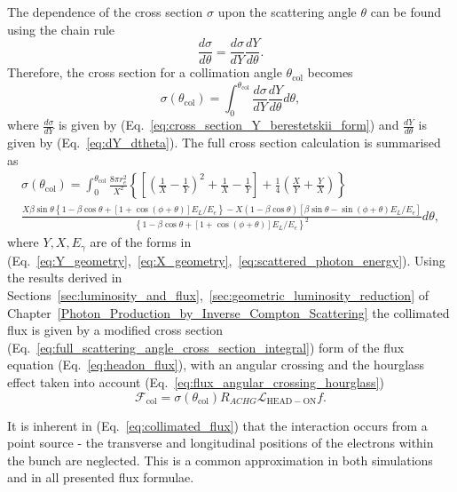 \documentclass[../main.tex]{subfiles}
\begin{document}
The dependence of the cross section $\sigma$ upon the scattering angle $\theta$ can be found using the chain rule
\begin{equation}
\frac{d\sigma}{d\theta} = \frac{d\sigma}{dY}\frac{dY}{d\theta}.
\label{eq:cross_section_chain_rule}
\end{equation}
Therefore, the cross section for a collimation angle $\theta_{\mathrm{col}}$ becomes
\begin{equation}
\sigma\left(\theta_{\mathrm{col}}\right) = \int_{0}^{\theta_{\mathrm{col}}}\frac{d\sigma}{dY}\frac{dY}{d\theta}d\theta,
\label{eq:cross_section_integral}
\end{equation} 
where $\frac{d\sigma}{dY}$ is given by (Eq.~\ref{eq:cross_section_Y_berestetskii_form}) and $\frac{dY}{d\theta}$ is given by (Eq.~\ref{eq:dY_dtheta}). The full cross section calculation is summarised as
\begin{multline}
\sigma\left(\theta_{\mathrm{col}}\right) = \int_{0}^{\theta_{\mathrm{col}}} \frac{8\pi r_{e}^{2}}{X^{2}}\left\{\left[\left(\frac{1}{X}-\frac{1}{Y}\right)^{2}+\frac{1}{X}-\frac{1}{Y}\right]+\frac{1}{4}\left(\frac{X}{Y}+\frac{Y}{X}\right)\right\}\\\frac{X\beta\sin\theta\left\{1-\beta\cos\theta+\left[1+\cos\left(\phi+\theta\right)\right]E_{L}/E_{e}\right\}-X\left(1-\beta\cos\theta\right)\left[\beta\sin\theta-\sin\left(\phi+\theta\right)E_{L}/E_{e}\right]}{\left\{1-\beta\cos\theta+\left[1+\cos\left(\phi+\theta\right)\right]E_{L}/E_{e}\right\}^{2}}d\theta,
\label{eq:full_scattering_angle_cross_section_integral}
\end{multline}
where $Y, X, E_{\gamma}$ are of the forms in (Eq.~\ref{eq:Y_geometry},~\ref{eq:X_geometry},~\ref{eq:scattered_photon_energy}). Using the results derived in Sections~\ref{sec:luminosity_and_flux},~\ref{sec:geometric_luminosity_reduction} of Chapter~\ref{Photon_Production_by_Inverse_Compton_Scattering} the collimated flux is given by a modified cross section (Eq.~\ref{eq:full_scattering_angle_cross_section_integral}) form of the flux equation (Eq.~\ref{eq:headon_flux}), with an angular crossing and the  hourglass effect taken into account (Eq.~\ref{eq:flux_angular_crossing_hourglass})
\begin{equation}
\mathcal{F}_{\mathrm{col}} = \sigma\left(\theta_{\mathrm{col}}\right) R_{ACHG}\mathcal{L}_{\mathrm{HEAD-ON}}f.
\label{eq:collimated_flux}
\end{equation}

It is inherent in (Eq.~\ref{eq:collimated_flux}) that the interaction occurs from a point source - the transverse and longitudinal positions of the electrons within the bunch are neglected. This is a common approximation in both simulations and in all presented flux formulae.
\end{document}
